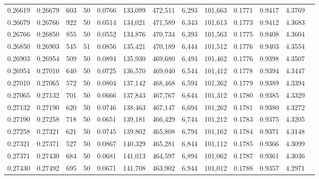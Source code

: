 \begin{tabular}{rrrrrrrrrrrrr}
0.26619 & 0.26679 &   603 &  50 &                                     0.0766 & 133,099 & 472,511 &   6,293 & 101,663 & 0.1771 & 0.9417 & 4.3769 \\
0.26679 & 0.26766 &   922 &  50 &                                     0.0514 & 134,021 & 471,589 &   6,343 & 101,613 & 0.1773 & 0.9412 & 4.3683 \\
0.26766 & 0.26850 &   855 &  50 &                                     0.0552 & 134,876 & 470,734 &   6,393 & 101,563 & 0.1775 & 0.9408 & 4.3604 \\
0.26850 & 0.26903 &   545 &  51 &                                     0.0856 & 135,421 & 470,189 &   6,444 & 101,512 & 0.1776 & 0.9403 & 4.3554 \\
0.26903 & 0.26954 &   509 &  50 &                                     0.0894 & 135,930 & 469,680 &   6,494 & 101,462 & 0.1776 & 0.9398 & 4.3507 \\
0.26954 & 0.27010 &   640 &  50 &                                     0.0725 & 136,570 & 469,040 &   6,544 & 101,412 & 0.1778 & 0.9394 & 4.3447 \\
0.27010 & 0.27065 &   572 &  50 &                                     0.0804 & 137,142 & 468,468 &   6,594 & 101,362 & 0.1779 & 0.9389 & 4.3394 \\
0.27065 & 0.27132 &   701 &  50 &                                     0.0666 & 137,843 & 467,767 &   6,644 & 101,312 & 0.1780 & 0.9385 & 4.3329 \\
0.27132 & 0.27190 &   620 &  50 &                                     0.0746 & 138,463 & 467,147 &   6,694 & 101,262 & 0.1781 & 0.9380 & 4.3272 \\
0.27190 & 0.27258 &   718 &  50 &                                     0.0651 & 139,181 & 466,429 &   6,744 & 101,212 & 0.1783 & 0.9375 & 4.3205 \\
0.27258 & 0.27321 &   621 &  50 &                                     0.0745 & 139,802 & 465,808 &   6,794 & 101,162 & 0.1784 & 0.9371 & 4.3148 \\
0.27321 & 0.27371 &   527 &  50 &                                     0.0867 & 140,329 & 465,281 &   6,844 & 101,112 & 0.1785 & 0.9366 & 4.3099 \\
0.27371 & 0.27430 &   684 &  50 &                                     0.0681 & 141,013 & 464,597 &   6,894 & 101,062 & 0.1787 & 0.9361 & 4.3036 \\
0.27430 & 0.27492 &   695 &  50 &                                     0.0671 & 141,708 & 463,902 &   6,944 & 101,012 & 0.1788 & 0.9357 & 4.2971 \\

\end{tabular}
